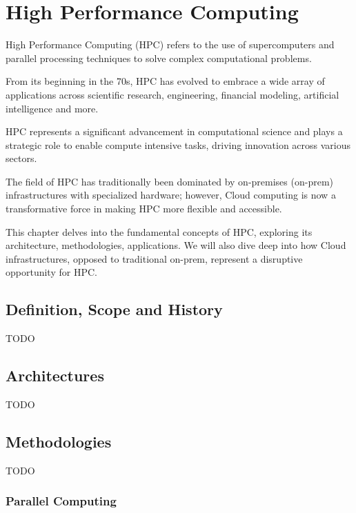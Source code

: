 

\chapter{High Performance Computing}

High Performance Computing (HPC) refers to the use of supercomputers and parallel processing techniques to solve complex computational problems. 

From its beginning in the 70s, HPC has evolved to embrace a wide array of applications across scientific research, engineering, financial modeling, artificial intelligence and more. 

HPC represents a significant advancement in computational science and plays a strategic role to enable compute intensive tasks, driving innovation across various sectors. 

The field of HPC has traditionally been dominated by on-premises (on-prem) infrastructures with specialized hardware; however, Cloud computing is now a transformative force in making HPC more flexible and accessible.

This chapter delves into the fundamental concepts of HPC, exploring its architecture, methodologies, applications. We will also dive deep into how Cloud infrastructures, opposed to traditional on-prem, represent a disruptive opportunity for HPC.

\section{Definition, Scope and History}

TODO

\section{Architectures}

TODO

\section{Methodologies}

TODO

\subsection{Parallel Computing}


